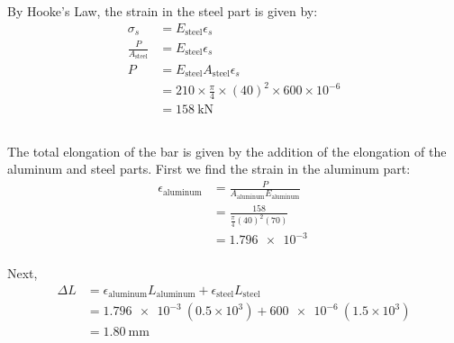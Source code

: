 \subsection{}
By Hooke's Law, the strain in the steel part is given by:
\begin{align*}
    \sigma_s &= E_{\text{steel}}\epsilon_s \\
    \frac{P}{A_{\text{steel}}} &= E_{\text{steel}}\epsilon_s \\
    P &= E_{\text{steel}}A_{\text{steel}}\epsilon_s \\
    &= 210 \times \frac{\pi}{4} \times (40)^2 \times 600 \times 10^{-6} \\
    &= \boxed{\qty{158}{\kilo\newton}}
\end{align*}

\subsection{}
The total elongation of the bar is given by the addition of the elongation of the aluminum and steel parts. First
we find the strain in the aluminum part:
\begin{align*}
    \epsilon_{\text{aluminum}} &= \frac{P}{A_{\text{aluminum}}E_{\text{aluminum}}} \\
    &= \frac{158}{\frac{\pi}{4}(40)^2(70)} \\
    &= \qty{1.796e-3}{} \\
\end{align*}

Next, 
\begin{align*}
    \Delta L &= \epsilon_{\text{aluminum}}L_{\text{aluminum}} + \epsilon_{\text{steel}}L_{\text{steel}} \\
    &= \qty{1.796e-3}{}(0.5\times 10^3) + \qty{600e-6}{}(1.5\times 10^3) \\
    &= \boxed{\qty{1.80}{\milli\meter}}
\end{align*}